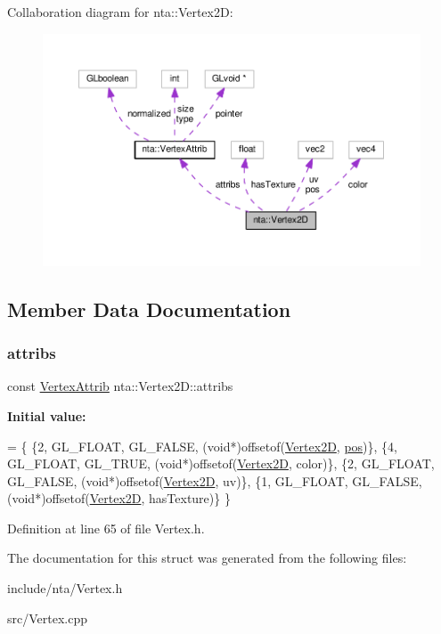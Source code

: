 Collaboration diagram for nta\+:\+:Vertex2D\+:\nopagebreak
\begin{figure}[H]
\begin{center}
\leavevmode
\includegraphics[width=350pt]{df/deb/structnta_1_1Vertex2D__coll__graph}
\end{center}
\end{figure}


\subsection{Member Data Documentation}
\mbox{\label{structnta_1_1Vertex2D_a6be835338c31e6ce40e1a2f5a3039560}} 
\subsubsection{\texorpdfstring{attribs}{attribs}}
{\footnotesize\ttfamily const \hyperlink{namespacenta_df/d9d/structnta_1_1VertexAttrib}{Vertex\+Attrib} nta\+::\+Vertex2\+D\+::attribs\hspace{0.3cm}{\ttfamily [static]}}

{\bfseries Initial value\+:}
\begin{DoxyCode}
= \{
        \{2, GL\_FLOAT, GL\_FALSE, (\textcolor{keywordtype}{void}*)offsetof(\hyperlink{structnta_1_1Vertex2D_a696744d55f56ae170684266eab073c0f}{Vertex2D}, \hyperlink{structnta_1_1Vertex2D_a27a44e1ca52b5a5a13d37495e9376636}{pos})\},
        \{4, GL\_FLOAT, GL\_TRUE,  (\textcolor{keywordtype}{void}*)offsetof(\hyperlink{structnta_1_1Vertex2D_a696744d55f56ae170684266eab073c0f}{Vertex2D}, color)\},
        \{2, GL\_FLOAT, GL\_FALSE, (\textcolor{keywordtype}{void}*)offsetof(\hyperlink{structnta_1_1Vertex2D_a696744d55f56ae170684266eab073c0f}{Vertex2D}, uv)\},
        \{1, GL\_FLOAT, GL\_FALSE, (\textcolor{keywordtype}{void}*)offsetof(\hyperlink{structnta_1_1Vertex2D_a696744d55f56ae170684266eab073c0f}{Vertex2D}, hasTexture)\}
    \}
\end{DoxyCode}


Definition at line 65 of file Vertex.\+h.



The documentation for this struct was generated from the following files\+:\begin{DoxyCompactItemize}
\item 
include/nta/Vertex.\+h\item 
src/Vertex.\+cpp\end{DoxyCompactItemize}
